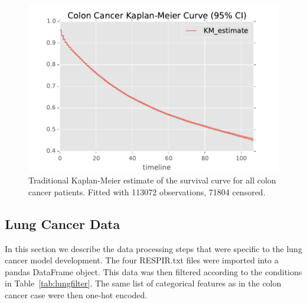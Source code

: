 \documentclass[a4paper,11pt]{article}
\begin{document}
\begin{figure}[tbp]
\centering 
\begin{center}
\includegraphics[width=.90\textwidth,origin=c]{colonkaplan.pdf}
\caption{\label{fig:colonkaplan} Traditional Kaplan-Meier estimate of the survival curve for all colon cancer patients. Fitted with 113072 observations, 71804 censored.}
\end{center}
\end{figure}





\subsection{Lung Cancer Data}
\label{subsec:lungcancerdata}

In this section we describe the data processing steps that were specific to the lung cancer model development. The four RESPIR.txt files were imported into a pandas DataFrame object.
This data was then filtered according to the conditions in Table~\ref{tab:lungfilter}.
The same list of categorical features as in the colon cancer case were then one-hot encoded.
\end{document}

